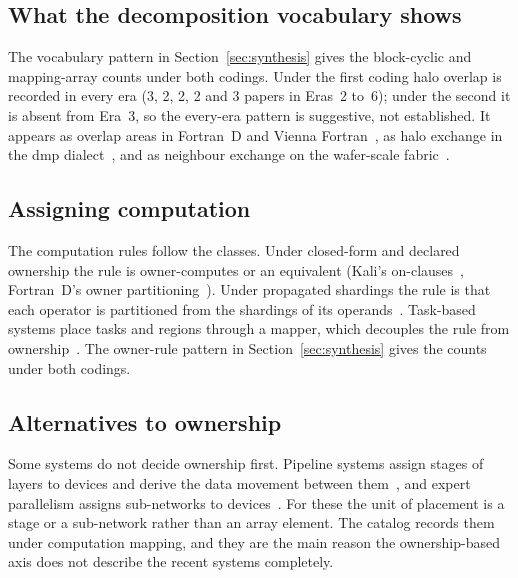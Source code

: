 \subsection{What the decomposition vocabulary shows}
The vocabulary pattern in Section~\ref{sec:synthesis} gives the block-cyclic and mapping-array counts under both codings. Under the first coding halo overlap is recorded in every era (3, 2, 2, 2 and 3 papers in Eras~2 to~6); under the second it is absent from Era~3, so the every-era pattern is suggestive, not established. It appears as overlap areas in Fortran~D and Vienna Fortran~\cite{hiranandani1991fortrand,chapman1992vienna}, as halo exchange in the dmp dialect~\cite{bisbas2024shared}, and as neighbour exchange on the wafer-scale fabric~\cite{rocki2020cerebras,stawinoga2026mlir}.

\subsection{Assigning computation}
The computation rules follow the classes. Under closed-form and declared ownership the rule is owner-computes or an equivalent (Kali's on-clauses~\cite{mehrotra1990kali}, Fortran~D's owner partitioning~\cite{hiranandani1991fortrand}). Under propagated shardings the rule is that each operator is partitioned from the shardings of its operands~\cite{xu2021gspmd}. Task-based systems place tasks and regions through a mapper, which decouples the rule from ownership~\cite{bauer2012legion}. The owner-rule pattern in Section~\ref{sec:synthesis} gives the counts under both codings.

\subsection{Alternatives to ownership}
Some systems do not decide ownership first. Pipeline systems assign stages of layers to devices and derive the data movement between them~\cite{narayanan2019pipedream}, and expert parallelism assigns sub-networks to devices~\cite{xu2021gspmd}. For these the unit of placement is a stage or a sub-network rather than an array element. The catalog records them under computation mapping, and they are the main reason the ownership-based axis does not describe the recent systems completely.
